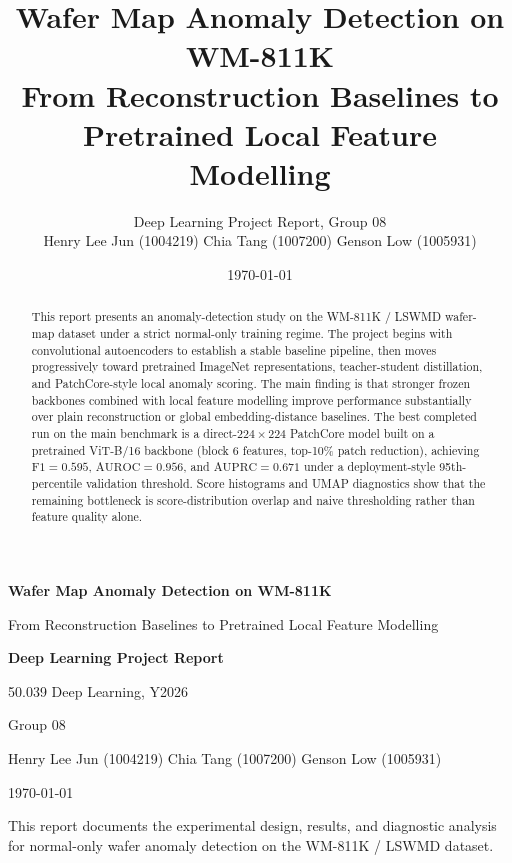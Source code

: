 \documentclass[11pt]{article}
\title{%
  \textbf{Wafer Map Anomaly Detection on WM-811K}\\[0.4em]
  \large From Reconstruction Baselines to Pretrained Local Feature Modelling
}
\author{Deep Learning Project Report, Group 08\\[0.3em]
  Henry Lee Jun (1004219) \quad Chia Tang (1007200) \quad Genson Low (1005931)}
\date{\today}
\begin{document}
\begin{titlepage}
  \centering
  \vspace*{2cm}
  {\LARGE\bfseries Wafer Map Anomaly Detection on WM-811K\par}
  \vspace{0.5cm}
  {\large From Reconstruction Baselines to Pretrained Local Feature Modelling\par}
  \vspace{1.5cm}
  {\large\bfseries Deep Learning Project Report\par}
  \vspace{0.4cm}
  {\large 50.039 Deep Learning, Y2026\par}
  \vspace{0.4cm}
  {\large Group 08\par}
  \vspace{0.6cm}
  {\normalsize
    Henry Lee Jun (1004219) \quad
    Chia Tang (1007200) \quad
    Genson Low (1005931)\par}
  \vspace{1cm}
  {\large \today\par}
  \vfill
  {\small This report documents the experimental design, results, and diagnostic analysis
  for normal-only wafer anomaly detection on the WM-811K / LSWMD dataset.\par}
\end{titlepage}


\begin{abstract}
This report presents an anomaly-detection study on the WM-811K / LSWMD wafer-map dataset
under a strict normal-only training regime. The project begins with convolutional autoencoders
to establish a stable baseline pipeline, then moves progressively toward pretrained
ImageNet representations, teacher-student distillation, and PatchCore-style local anomaly
scoring. The main finding is that stronger frozen backbones combined with local feature
modelling improve performance substantially over plain reconstruction or global
embedding-distance baselines. The best completed run on the main benchmark is a
direct-$224\!\times\!224$ PatchCore model built on a pretrained ViT-B/16 backbone
(block 6 features, top-10\% patch reduction), achieving $\mathrm{F1}=0.595$,
$\mathrm{AUROC}=0.956$, and $\mathrm{AUPRC}=0.671$ under a deployment-style
95th-percentile validation threshold.
Score histograms and UMAP diagnostics show that the remaining bottleneck is
score-distribution overlap and naive thresholding rather than feature quality alone.
\end{abstract}
\end{document}
